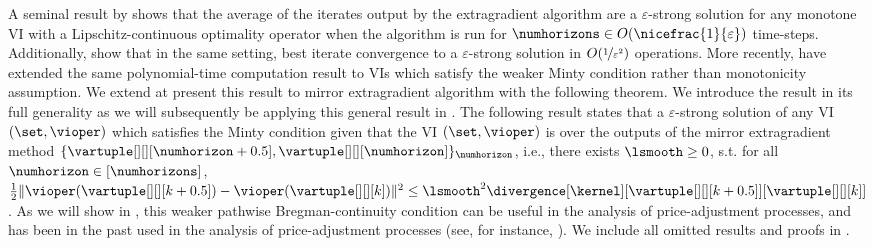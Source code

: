 A seminal result by \citet{nemirovski2004prox} shows that the average of the iterates output by the extragradient algorithm are a $\varepsilon$-strong solution for any monotone VI with a Lipschitz-continuous optimality operator when the algorithm is run for $\numhorizons \in O(\nicefrac{1}{\varepsilon})$ time-steps. Additionally, \citet{golowich2020eglast, cai2022tight} show that in the same setting, best iterate convergence to a $\varepsilon$-strong solution in $O(\nicefrac{1}{\varepsilon^2})$ operations. More recently, \citet{huang2023beyond} have extended the same polynomial-time computation result to VIs which satisfy the weaker Minty condition rather than monotonicity assumption. We extend at present this result to mirror extragradient algorithm with the following theorem. We introduce the result in its full generality as we will subsequently be applying this general result in . The following result states that a $\varepsilon$-strong solution of any VI $(\set, \vioper)$ which satisfies the Minty condition given that the VI $(\set, \vioper)$ is  over the outputs of the mirror extragradient method $\{\vartuple[][][\numhorizon + 0.5], \vartuple[][][\numhorizon]\}_{\numhorizon}$, i.e., there exists $\lsmooth \geq 0$, s.t. for all $\numhorizon \in [\numhorizons]$, $\frac{1}{2}\|\vioper(\vartuple[][][k+0.5]) - \vioper(\vartuple[][][k])\|^2 \leq \lsmooth^2 \divergence[\kernel][{\vartuple[][][k+0.5]}][{\vartuple[][][k]}]$. As we will show in , this weaker pathwise Bregman-continuity condition can be useful in the analysis of price-adjustment processes, and has been in the past used in the analysis of price-adjustment processes (see, for instance, \citet{fisher-tatonnement}). We include all omitted results and proofs in .





